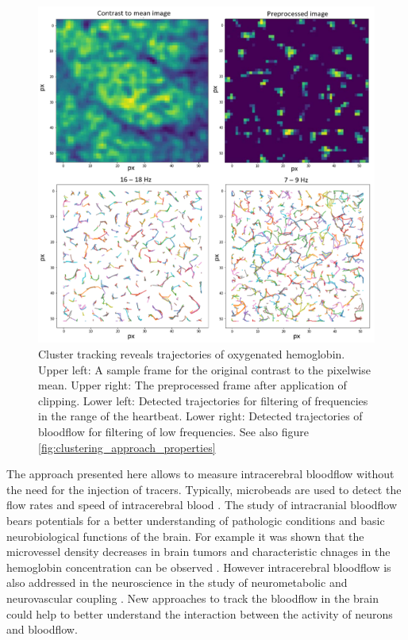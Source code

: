 \begin{figure}[th]
\centering
\includegraphics[width=\textwidth,height=\textheight,keepaspectratio]{Figures/clustering_approach_results}
\decoRule
\caption[Cluster tracking reveals trajectories of oxygenated hemoglobin]{Cluster tracking reveals trajectories of oxygenated hemoglobin.\\
Upper left: A sample frame for the original contrast to the pixelwise mean. Upper right: The preprocessed frame after application of clipping. Lower left: Detected trajectories for filtering of frequencies in the range of the heartbeat. Lower right: Detected trajectories of bloodflow for filtering of low frequencies. See also figure \ref{fig:clustering_approach_properties}}
\label{fig:clustering_approach_results}
\end{figure}
The approach presented here allows to measure intracerebral bloodflow without the need for the injection of tracers. Typically, microbeads are used to detect the flow rates and speed of intracerebral blood \parencite{kim2019development}. The study of intracranial bloodflow bears potentials for a better understanding of pathologic conditions and basic neurobiological functions of the brain. For example it was shown that the microvessel density decreases in brain tumors and characteristic chnages in the hemoglobin concentration can be observed \parencite{lee2014vivo}. However intracerebral bloodflow is also addressed in the neuroscience in the study of neurometabolic and neurovascular coupling \parencite{devor2012frontiers}. New approaches to track the bloodflow in the brain could help to better understand the interaction between the activity of neurons and bloodflow.\\
